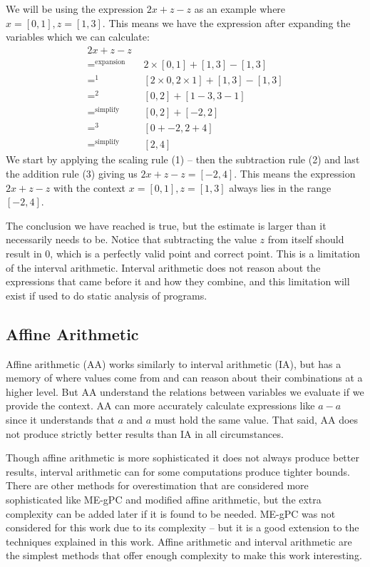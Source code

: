 We will be using the expression $2x + z - z$ as an example where $x = [0, 1], z = [1, 3]$. This means we have the expression after expanding the variables which we can calculate:
\begin{align*}
  2x + z - z \\
  =^{\text{expansion}} \quad & 2 \times [0, 1] + [1, 3] - [1, 3] \\
  =^{1}                \quad & [2 \times 0, 2 \times 1] + [1, 3] - [1, 3] \\
  =^{2}                \quad & [0, 2] + [1 - 3, 3 - 1] \\
  =^{\text{simplify}}  \quad & [0, 2] + [-2, 2] \\
  =^{3}                \quad & [0 + -2, 2 + 4] \\
  =^{\text{simplify}}  \quad & [2, 4]
\end{align*}
We start by applying the scaling rule (1) -- then the subtraction rule (2) and last the addition rule (3) giving us $2x + z - z = [-2, 4]$. This means the expression $2x + z - z$ with the context $x = [0, 1], z = [1, 3]$ always lies in the range $[-2, 4]$.
\label{sec:prevResultIA}

The conclusion we have reached is true, but the estimate is larger than it necessarily needs to be. Notice that subtracting the value $z$ from itself should result in $0$, which is a perfectly valid point and correct point. This is a limitation of the interval arithmetic. Interval arithmetic does not reason about the expressions that came before it and how they combine, and this limitation will exist if used to do static analysis of programs. 

\subsection{Affine Arithmetic}
Affine arithmetic (AA) works similarly to interval arithmetic (IA), but has a memory of where values come from and can reason about their combinations at a higher level. But AA understand the relations between variables we evaluate if we provide the context. AA can more accurately calculate expressions like $a - a$ since it understands that $a$ and $a$ must hold the same value. That said, AA does not produce strictly better results than IA in all circumstances.\cite{src:affAri}

Though affine arithmetic is more sophisticated it does not always produce better results, interval arithmetic can for some computations produce tighter bounds. There are other methods for overestimation that are considered more sophisticated like ME-gPC \cite{src:MEgPC} and modified affine arithmetic, but the extra complexity can be added later if it is found to be needed. ME-gPC was not considered for this work due to its complexity -- but it is a good extension to the techniques explained in this work. Affine arithmetic and interval arithmetic are the simplest methods that offer enough complexity to make this work interesting.

